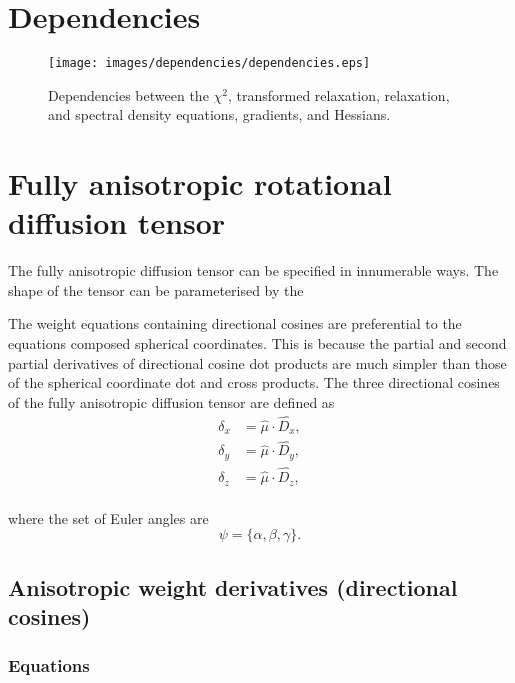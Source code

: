 
\newpage
\section{Dependencies}


\begin{figure}[!h]
\centerline{\texttt{[image: images/dependencies/dependencies.eps]}}
\caption{Dependencies between the $\chi^2$, transformed relaxation, relaxation, and spectral density equations, gradients, and Hessians.}\label{fig: dependencies}
\end{figure}




\newpage
\section{Fully anisotropic rotational diffusion tensor}

The fully anisotropic diffusion tensor can be specified in innumerable ways.  The shape of the tensor can be parameterised by the 


The weight equations containing directional cosines are preferential to the equations composed spherical coordinates.  This is because the partial and second partial derivatives of directional cosine dot products are much simpler than those of the spherical coordinate dot and cross products.  The three directional cosines of the fully anisotropic diffusion tensor are defined as
\begin{align}
    \delta_x &= \hat\mu \cdot \widehat{D_x},  \label{eq: dir cos: dx} \\
    \delta_y &= \hat\mu \cdot \widehat{D_y},  \label{eq: dir cos: dy} \\
    \delta_z &= \hat\mu \cdot \widehat{D_z},  \label{eq: dir cos: dz} \\
\end{align}

\noindent where the set of Euler angles are
\begin{equation}
    \psi = \{\alpha, \beta, \gamma\}.   \label{eq: dir cos: euler}
\end{equation}



\subsection{Anisotropic weight derivatives (directional cosines)}

\subsubsection{Equations}



